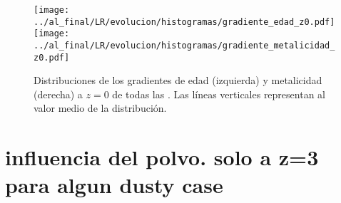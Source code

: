 


\begin{figure}[H]
 \texttt{[image: ../al\_final/LR/evolucion/histogramas/gradiente\_edad\_z0.pdf]}
 \texttt{[image: ../al\_final/LR/evolucion/histogramas/gradiente\_metalicidad\_z0.pdf]}
\caption{Distribuciones de los gradientes de edad (izquierda) y metalicidad (derecha) a $z=0$ de todas las \bcgs. Las l\'ineas verticales representan
al valor medio de la distribuci\'on.}
\label{fig:gradientes}
\end{figure}



\section{influencia del polvo. solo a z=3 para algun dusty case}

